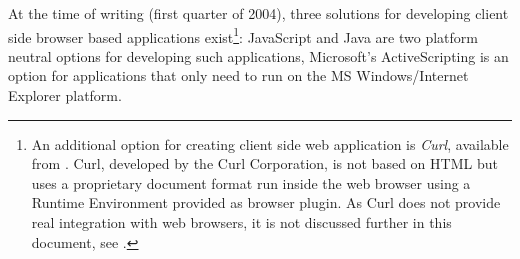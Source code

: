 At the time of writing (first quarter of 2004), three solutions for developing client side browser based applications exist\footnote{An additional option for creating client side web application is \emph{Curl}, available from \cite{CurlHp}. Curl, developed by the Curl Corporation, is not based on HTML but uses a proprietary document format run inside the web browser using a Runtime Environment provided as browser plugin. As Curl does not provide real integration with web browsers, it is not discussed further in this document, see \cite{CurlCWP}.}: JavaScript and Java are two platform neutral options for developing such applications, Microsoft's ActiveScripting is an option for applications that only need to run on the MS Windows/Internet Explorer platform.
